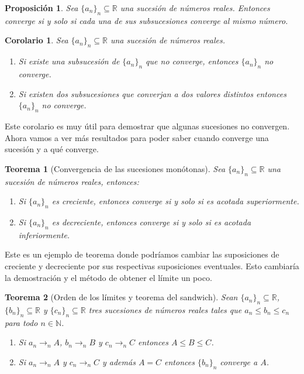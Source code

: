 \documentclass{article}
\newtheorem{theorem}{Teorema}
\newtheorem{prop}{Proposición}
\newtheorem{cor}{Corolario}
\newcommand{\reales}{\mathbb{R}}
\newcommand{\naturales}{\mathbb{N}}
\newcommand{\sucesion}[1]{\{ #1 _n \}_n}
\newcommand{\sucreal}[1]{\{ #1 _n \}_n \subseteq \reales}
\newcommand{\converge}[2]{#1 _n \rightarrow_{n} #2}
\begin{document}
\begin{prop}
	Sea $\sucreal{a}$ una sucesión de números reales. Entonces converge si y solo si cada una de sus subsucesiones converge al mismo número.
\end{prop}

\begin{cor}
	Sea $\sucreal{a}$ una sucesión de números reales.
	\begin{enumerate}
		\item
		Si existe una subsucesión de $\sucesion{a}$ que no converge, entonces $\sucesion{a}$ no converge.
		\item
		Si existen dos subsucesiones que converjan a dos valores distintos entonces $\sucesion{a}$ no converge.
	\end{enumerate}
\end{cor}

Este corolario es muy útil para demostrar que algunas sucesiones no convergen. Ahora vamos a ver más resultados para poder saber cuando converge una sucesión y a qué converge.

\begin{theorem}[Convergencia de las sucesiones monótonas]
Sea $\sucreal{a}$ una sucesión de números reales, entonces:
\begin{enumerate}
\item
Si $\sucesion{a}$ es creciente, entonces converge si y solo si es acotada superiormente.
\item
Si $\{ a_n\}_n$ es decreciente, entonces converge si y solo si es acotada inferiormente. 
\end{enumerate}
\end{theorem}

Este es un ejemplo de teorema donde podríamos cambiar las suposiciones de creciente y decreciente por sus respectivas suposiciones eventuales. Esto cambiaría la demostración y el método de obtener el límite un poco.

\begin{theorem}[Orden de los límites y teorema del sandwich]
Sean $\sucreal{a}$, $\sucreal{b}$ y $\sucreal{c}$ tres sucesiones de números reales tales que $a_n \leq b_n \leq c_n$ para todo $n \in \naturales$.
\begin{enumerate}
\item
Si $\converge{a}{A}$, $\converge{b}{B}$ y $\converge{c}{C}$ entonces $A \leq B \leq C$.
\item
Si $\converge{a}{A}$ y $\converge{c}{C}$ y además $A = C$ entonces $\sucesion{b}$ converge a $A$.
\end{enumerate}
\end{theorem}
\end{document}
